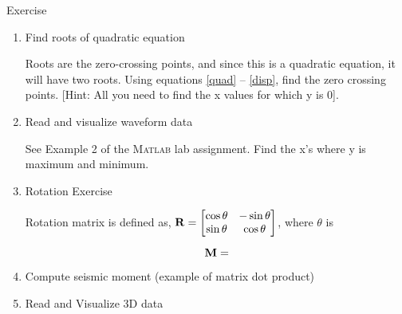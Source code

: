 \documentclass[11pt,titlepage,fleqn]{article}
\newcommand{\matlab}{\textsc{Matlab}\xspace}
\begin{document}
\begin{section}{Exercise}
\begin{enumerate}
\item Find roots of quadratic equation

Roots are the zero-crossing points, and since this is a quadratic equation, it will have two roots.  Using equations \ref{quad} -- \ref{disp}, find the zero crossing points. [Hint: All you need to find the x values for which y is 0].

\item Read and visualize waveform data

See Example 2 of the \matlab lab assignment. Find the x's where y is maximum and minimum.

\item Rotation Exercise

Rotation matrix is defined as, 
${\bf R} = 
\begin{bmatrix} 
\cos \theta & -\sin \theta \\
\sin \theta & \cos \theta
\end{bmatrix}$, 
where $\theta$ is 

\begin{equation}
{\bf M} = 
\end{equation}

\item Compute seismic moment (example of matrix dot product)

\item Read and Visualize 3D data

\end{enumerate}
\end{section}
\end{document}
